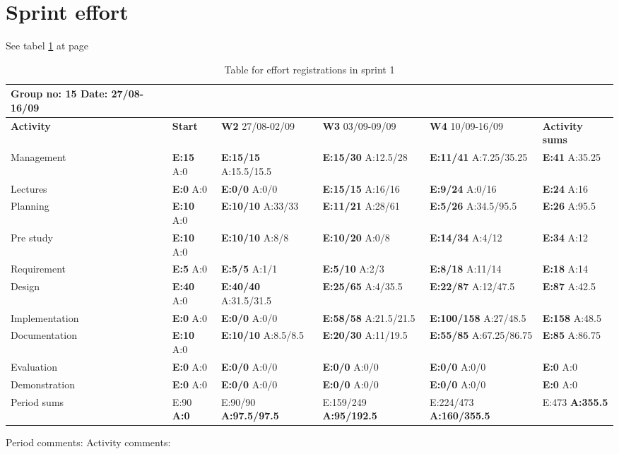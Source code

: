 \section{Sprint effort}
See tabel \ref{tab:effortweekss1} at page \pageref{tab:effortweekss1}
\begin{table}
\begin{tabularx}{\linewidth}{>{\setlength\hsize{.625\hsize}}X|>{\setlength\hsize{0.3\hsize}}X|>{\setlength\hsize{0.5\hsize}}X|>{\setlength\hsize{0.5\hsize}}X|>{\setlength\hsize{0.5\hsize}}X|>{\setlength\hsize{.3\hsize}}X}
Group no: 15 Date: 27/08-16/09  \\ \hline
\textbf{Activity} & \textbf{Start} & \textbf{W2} 27/08-02/09 & \textbf{W3} 03/09-09/09 & \textbf{W4} 10/09-16/09 & \textbf{Activity sums} \\ \hline \hline
Management & \textbf{E:15} A:0 & \textbf{E:15/15} A:15.5/15.5 & \textbf{E:15/30} A:12.5/28 & \textbf{E:11/41} A:7.25/35.25 & \textbf{E:41} A:35.25  \\ \hline
Lectures & \textbf{E:0} A:0 & \textbf{E:0/0} A:0/0 & \textbf{E:15/15} A:16/16 & \textbf{E:9/24} A:0/16 & \textbf{E:24 } A:16  \\ \hline
Planning & \textbf{E:10} A:0 & \textbf{E:10/10} A:33/33 & \textbf{E:11/21} A:28/61 & \textbf{E:5/26} A:34.5/95.5 & \textbf{E:26 } A:95.5  \\ \hline
Pre study & \textbf{E:10} A:0 & \textbf{E:10/10} A:8/8 & \textbf{E:10/20} A:0/8 & \textbf{E:14/34} A:4/12 & \textbf{E:34 } A:12  \\ \hline
Requirement & \textbf{E:5} A:0 & \textbf{E:5/5} A:1/1 & \textbf{E:5/10} A:2/3 & \textbf{E:8/18} A:11/14 & \textbf{E:18 } A:14  \\ \hline
Design & \textbf{E:40} A:0 & \textbf{E:40/40} A:31.5/31.5 & \textbf{E:25/65} A:4/35.5 & \textbf{E:22/87} A:12/47.5 & \textbf{E:87 } A:42.5  \\ \hline
Implementation & \textbf{E:0} A:0 & \textbf{E:0/0} A:0/0 & \textbf{E:58/58} A:21.5/21.5 & \textbf{E:100/158} A:27/48.5 & \textbf{E:158 } A:48.5  \\ \hline
Documentation & \textbf{E:10} A:0 & \textbf{E:10/10} A:8.5/8.5 & \textbf{E:20/30} A:11/19.5 & \textbf{E:55/85} A:67.25/86.75 & \textbf{E:85 } A:86.75  \\ \hline
Evaluation & \textbf{E:0} A:0 & \textbf{E:0/0} A:0/0 & \textbf{E:0/0} A:0/0 & \textbf{E:0/0} A:0/0 & \textbf{E:0 } A:0  \\ \hline
Demonstration & \textbf{E:0} A:0 & \textbf{E:0/0} A:0/0 & \textbf{E:0/0} A:0/0 & \textbf{E:0/0} A:0/0 & \textbf{E:0 } A:0  \\ \hline
Period sums & E:90 \textbf{A:0} & E:90/90 \textbf{A:97.5/97.5} & E:159/249 \textbf{A:95/192.5} & E:224/473 \textbf{A:160/355.5} & E:473 \textbf{A:355.5}
\end{tabularx}

Period comments: 
\newline
\newline
Activity comments:
\caption{Table for effort registrations in sprint 1} \label{tab:effortweekss1}
\end{table}

